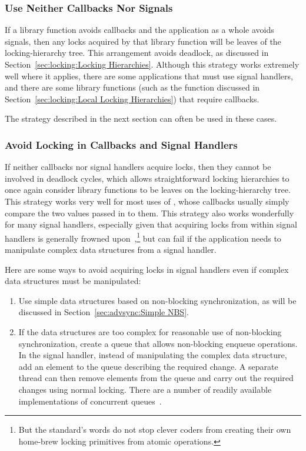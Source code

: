 \subsubsection{Use Neither Callbacks Nor Signals}
\label{sec:locking:Use Neither Callbacks Nor Signals}

If a library function avoids callbacks and the application as a whole
avoids signals, then any locks acquired by that library function will
be leaves of the locking-hierarchy tree.
This arrangement avoids deadlock, as discussed in
Section~\ref{sec:locking:Locking Hierarchies}.
Although this strategy works extremely well where it applies,
there are some applications that must use signal handlers,
and there are some library functions (such as the  function
discussed in
Section~\ref{sec:locking:Local Locking Hierarchies})
that require callbacks.

The strategy described in the next section can often be used in these cases.

\subsubsection{Avoid Locking in Callbacks and Signal Handlers}
\label{sec:locking:Avoid Locking in Callbacks and Signal Handlers}

If neither callbacks nor signal handlers acquire locks, then they
cannot be involved in deadlock cycles, which allows straightforward
locking hierarchies to once again consider library functions to
be leaves on the locking-hierarchy tree.
This strategy works very well for most uses of , whose
callbacks usually simply compare the two values passed in to them.
This strategy also works wonderfully for many signal handlers,
especially given that acquiring locks from within signal handlers
is generally frowned upon~\cite{TheOpenGroup1997SUS},\footnote{
	But the standard's words do not stop clever coders from creating
	their own home-brew locking primitives from atomic operations.}
but can fail if the application needs to manipulate complex data structures
from a signal handler.

Here are some ways to avoid acquiring locks in signal handlers even
if complex data structures must be manipulated:

\begin{enumerate}
\item	Use simple data structures based on non-blocking synchronization,
	as will be discussed in
	Section~\ref{sec:advsync:Simple NBS}.
\item	If the data structures are too complex for reasonable use of
	non-blocking synchronization, create a queue that allows
	non-blocking enqueue operations.
	In the signal handler, instead of manipulating the complex
	data structure, add an element to the queue describing the
	required change.
	A separate thread can then remove elements from the queue and
	carry out the required changes using normal locking.
	There are a number of readily available implementations of
	concurrent
	queues~\cite{ChristophMKirsch2012FIFOisntTR,MathieuDesnoyers2009URCU,MichaelScott96}.
\end{enumerate}

